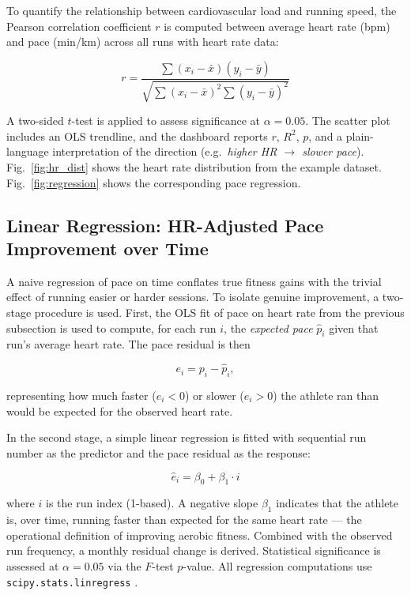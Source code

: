 \documentclass[conference]{IEEEtran}
\begin{document}
To quantify the relationship between cardiovascular load and running speed, the Pearson correlation coefficient $r$ is computed between average heart rate (bpm) and pace (min/km) across all runs with heart rate data:

\begin{equation}
    r = \frac{\sum (x_i - \bar{x})(y_i - \bar{y})}{\sqrt{\sum (x_i - \bar{x})^2 \sum (y_i - \bar{y})^2}}
\end{equation}

A two-sided $t$-test is applied to assess significance at $\alpha = 0.05$. The scatter plot includes an OLS trendline, and the dashboard reports $r$, $R^2$, $p$, and a plain-language interpretation of the direction (e.g.\ \textit{higher HR $\rightarrow$ slower pace}). Fig.~\ref{fig:hr_dist} shows the heart rate distribution from the example dataset. Fig.~\ref{fig:regression} shows the corresponding pace regression.

\subsection{Linear Regression: HR-Adjusted Pace Improvement over Time}

A naive regression of pace on time conflates true fitness gains with the trivial effect of running easier or harder sessions. To isolate genuine improvement, a two-stage procedure is used. First, the OLS fit of pace on heart rate from the previous subsection is used to compute, for each run $i$, the \textit{expected pace} $\hat{p}_i$ given that run's average heart rate. The pace residual is then

\begin{equation}
    e_i = p_i - \hat{p}_i,
\end{equation}

representing how much faster ($e_i < 0$) or slower ($e_i > 0$) the athlete ran than would be expected for the observed heart rate.

In the second stage, a simple linear regression is fitted with sequential run number as the predictor and the pace residual as the response:

\begin{equation}
    \hat{e}_i = \beta_0 + \beta_1 \cdot i
\end{equation}

where $i$ is the run index (1-based). A negative slope $\beta_1$ indicates that the athlete is, over time, running faster than expected for the same heart rate --- the operational definition of improving aerobic fitness. Combined with the observed run frequency, a monthly residual change is derived. Statistical significance is assessed at $\alpha = 0.05$ via the $F$-test $p$-value. All regression computations use \texttt{scipy.stats.linregress} \cite{scipy}.
\end{document}
